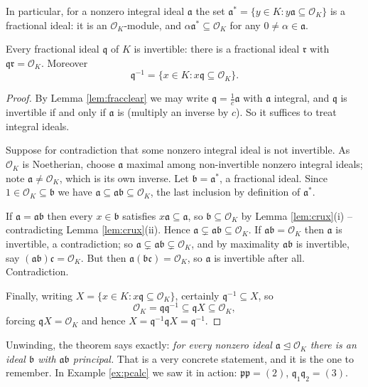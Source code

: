 \documentclass[a4paper]{scrartcl}
\renewcommand{\OO}{\mathcal{O}}
\newcommand{\fa}{\mathfrak{a}}
\newcommand{\fb}{\mathfrak{b}}
\newcommand{\fc}{\mathfrak{c}}
\newcommand{\fp}{\mathfrak{p}}
\newcommand{\fq}{\mathfrak{q}}
\newcommand{\fr}{\mathfrak{r}}
\begin{document}
In particular, for a nonzero integral ideal $\fa$ the set $\fa^* = \{y \in K : y\fa \subseteq \OO_K\}$ is a fractional ideal: it is an $\OO_K$-module, and $\alpha\fa^* \subseteq \OO_K$ for any $0 \neq \alpha \in \fa$.

\begin{theorem}\label{thm:invertible}
	Every fractional ideal $\fq$ of $K$ is invertible: there is a fractional ideal $\fr$ with $\fq\fr = \OO_K$. Moreover
	$$\fq^{-1} = \{x \in K : x\fq \subseteq \OO_K\}.$$
\end{theorem}

\begin{proof}
	By Lemma \ref{lem:fracclear} we may write $\fq = \tfrac{1}{c}\fa$ with $\fa$ integral, and $\fq$ is invertible if and only if $\fa$ is (multiply an inverse by $c$). So it suffices to treat integral ideals.

	Suppose for contradiction that some nonzero integral ideal is not invertible. As $\OO_K$ is Noetherian, choose $\fa$ maximal among non-invertible nonzero integral ideals; note $\fa \neq \OO_K$, which is its own inverse. Let $\fb = \fa^*$, a fractional ideal. Since $1 \in \OO_K \subseteq \fb$ we have $\fa \subseteq \fa\fb \subseteq \OO_K$, the last inclusion by definition of $\fa^*$.

	If $\fa = \fa\fb$ then every $x \in \fb$ satisfies $x\fa \subseteq \fa$, so $\fb \subseteq \OO_K$ by Lemma \ref{lem:crux}(i) -- contradicting Lemma \ref{lem:crux}(ii). Hence $\fa \subsetneq \fa\fb \subseteq \OO_K$. If $\fa\fb = \OO_K$ then $\fa$ is invertible, a contradiction; so $\fa \subsetneq \fa\fb \subsetneq \OO_K$, and by maximality $\fa\fb$ is invertible, say $(\fa\fb)\fc = \OO_K$. But then $\fa(\fb\fc) = \OO_K$, so $\fa$ is invertible after all. Contradiction.

	Finally, writing $X = \{x \in K : x\fq \subseteq \OO_K\}$, certainly $\fq^{-1} \subseteq X$, so
	$$\OO_K = \fq\fq^{-1} \subseteq \fq X \subseteq \OO_K,$$
	forcing $\fq X = \OO_K$ and hence $X = \fq^{-1}\fq X = \fq^{-1}$.
\end{proof}

\begin{remark}
	Unwinding, the theorem says exactly: \emph{for every nonzero ideal $\fa \trianglelefteq \OO_K$ there is an ideal $\fb$ with $\fa\fb$ principal.} That is a very concrete statement, and it is the one to remember. In Example \ref{ex:pcalc} we saw it in action: $\fp\fp = (2)$, $\fq_1\fq_2 = (3)$.
\end{remark}
\end{document}
